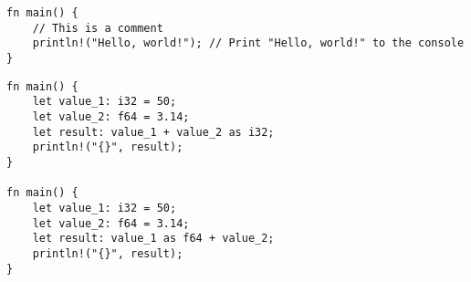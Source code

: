 \begin{lstlisting}[style=rust]
fn main() {
	// This is a comment
	println!("Hello, world!"); // Print "Hello, world!" to the console
}
\end{lstlisting}

\begin{lstlisting}[style=rust]
fn main() {
	let value_1: i32 = 50;
	let value_2: f64 = 3.14;
	let result: value_1 + value_2 as i32;
	println!("{}", result);
}

fn main() {
	let value_1: i32 = 50;
	let value_2: f64 = 3.14;
	let result: value_1 as f64 + value_2;
	println!("{}", result);
}
\end{lstlisting}

% 
